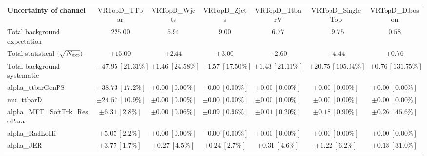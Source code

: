 
\begin{sidewaystable}
\begin{center}
\setlength{\tabcolsep}{0.0pc}
\begin{tabular*}{\textwidth}{@{\extracolsep{\fill}}lcccccc}
\noalign{\smallskip}\hline\noalign{\smallskip}
{\bf Uncertainty of channel}                                    & VRTopD\_TTbar            & VRTopD\_Wjets            & VRTopD\_Zjets            & VRTopD\_TtbarV            & VRTopD\_SingleTop            & VRTopD\_Diboson            \\
\noalign{\smallskip}\hline\noalign{\smallskip}
Total background expectation             &  $225.00$        &  $5.94$        &  $9.00$        &  $6.77$        &  $19.75$        &  $0.58$       \\
\noalign{\smallskip}\hline\noalign{\smallskip}
Total statistical $(\sqrt{N_{\rm exp}})$              & $\pm 15.00$        & $\pm 2.44$        & $\pm 3.00$        & $\pm 2.60$        & $\pm 4.44$        & $\pm 0.76$       \\
Total background systematic               & $\pm 47.95\ [21.31\%] $        & $\pm 1.46\ [24.58\%] $        & $\pm 1.57\ [17.50\%] $        & $\pm 1.43\ [21.11\%] $        & $\pm 20.75\ [105.04\%] $        & $\pm 0.76\ [131.75\%] $             \\
\noalign{\smallskip}\hline\noalign{\smallskip}
\noalign{\smallskip}\hline\noalign{\smallskip}
alpha\_ttbarGenPS         & $\pm 38.73\ [17.2\%] $          & $\pm 0.00\ [0.00\%] $          & $\pm 0.00\ [0.00\%] $          & $\pm 0.00\ [0.00\%] $          & $\pm 0.00\ [0.00\%] $          & $\pm 0.00\ [0.00\%] $       \\
mu\_ttbarD         & $\pm 24.57\ [10.9\%] $          & $\pm 0.00\ [0.00\%] $          & $\pm 0.00\ [0.00\%] $          & $\pm 0.00\ [0.00\%] $          & $\pm 0.00\ [0.00\%] $          & $\pm 0.00\ [0.00\%] $       \\
alpha\_MET\_SoftTrk\_ResoPara         & $\pm 6.31\ [2.8\%] $          & $\pm 0.00\ [0.06\%] $          & $\pm 0.09\ [0.96\%] $          & $\pm 0.01\ [0.20\%] $          & $\pm 0.18\ [0.90\%] $          & $\pm 0.26\ [45.6\%] $       \\
alpha\_RadLoHi         & $\pm 5.05\ [2.2\%] $          & $\pm 0.00\ [0.00\%] $          & $\pm 0.00\ [0.00\%] $          & $\pm 0.00\ [0.00\%] $          & $\pm 0.00\ [0.00\%] $          & $\pm 0.00\ [0.00\%] $       \\
alpha\_JER         & $\pm 3.77\ [1.7\%] $          & $\pm 0.27\ [4.5\%] $          & $\pm 0.24\ [2.7\%] $          & $\pm 0.31\ [4.6\%] $          & $\pm 1.22\ [6.2\%] $          & $\pm 0.18\ [31.0\%] $       \\

\end{tabular*}
\end{center}
\end{sidewaystable}
